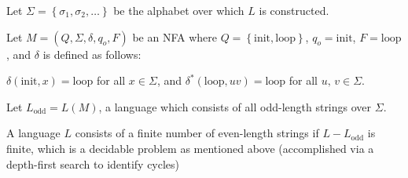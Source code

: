 \documentclass{report}
\begin{document}
Let $\Sigma = \left\{ \sigma_1, \sigma_2, \dots \right\}$ be the alphabet over which $L$ is constructed. 

Let $M = \left(Q, \Sigma, \delta, q_o, F \right)$  be an NFA
where $Q = \left\{ \text{init}, \text{loop} \right\}$, $q_o = \text{init}$, $F = \text{loop}$, and $\delta$ is defined as follows:

$\delta(\text{init}, x) = \text{loop}$ for all $x \in \Sigma$, and $\delta^*(\text{loop}, uv) = \text{loop}$ for all $u, \, v \in \Sigma$.

Let $L_\text{odd} = L(M)$, a language which consists of all odd-length strings over $\Sigma$.

A language $L$ consists of a finite number of even-length strings if $L - L_\text{odd}$ is finite, which is a decidable problem as mentioned above (accomplished via a depth-first search to identify cycles)

 
\end{document}
